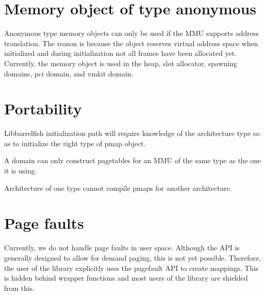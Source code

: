 \documentclass[a4paper,twoside]{report} %
\begin{document}
\section{Memory object of type anonymous}
Anonymous type memory objects can only be used if the MMU supports address translation.
The reason is because the object reserves virtual address space when initialized
and during initialization not all frames have been allocated yet.
Currently, the memory object is used in the heap, slot allocator, spawning domains, pci domain, and vmkit domain.

\section{Portability}
Libbarrelfish initialization path will require knowledge of the architecture type
so as to initialize the right type of pmap object.

A domain can only construct pagetables for an MMU of the same type as the one it is using.

Architecture of one type cannot compile pmaps for another architecture.

\section{Page faults}
Currently, we do not handle page faults in user space.
Although the API is generally designed to allow for demand paging, this is not yet possible.
Therefore, the user of the library explicitly uses the pagefault API to create mappings.
This is hidden behind wrapper functions and most users of the library are shielded from this.
\end{document}
